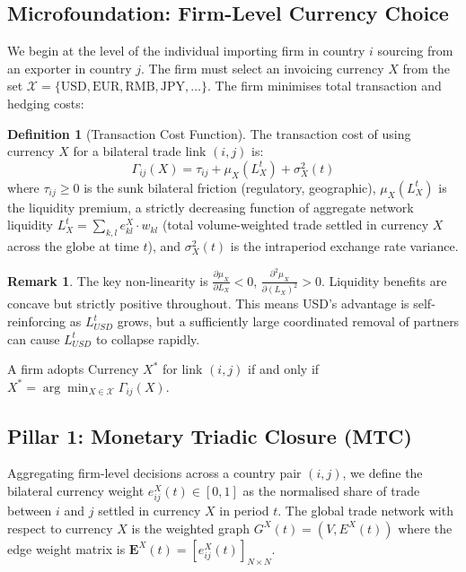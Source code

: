 \documentclass[12pt, letterpaper]{article}
\theoremstyle{definition}
\newtheorem{definition}{Definition}
\newtheorem{remark}{Remark}
\begin{document}
\subsection{Microfoundation: Firm-Level Currency Choice}

We begin at the level of the individual importing firm in country $i$ sourcing from an exporter in country $j$. The firm must select an invoicing currency $X$ from the set $\mathcal{X} = \{\text{USD}, \text{EUR}, \text{RMB}, \text{JPY}, \ldots \}$. The firm minimises total transaction and hedging costs:

\begin{definition}[Transaction Cost Function]
The transaction cost of using currency $X$ for a bilateral trade link $(i,j)$ is:
\begin{equation}
\Gamma_{ij}(X) = \tau_{ij} + \mu_X(L_X^t) + \sigma_X^2(t)
\label{eq:micro}
\end{equation}
where $\tau_{ij} \geq 0$ is the sunk bilateral friction (regulatory, geographic), $\mu_X(L_X^t)$ is the liquidity premium, a strictly decreasing function of aggregate network liquidity $L_X^t = \sum_{k,l} e_{kl}^X \cdot w_{kl}$ (total volume-weighted trade settled in currency $X$ across the globe at time $t$), and $\sigma_X^2(t)$ is the intraperiod exchange rate variance.
\end{definition}

\begin{remark}
The key non-linearity is $\frac{\partial \mu_X}{\partial L_X} < 0$, $\frac{\partial^2 \mu_X}{\partial (L_X)^2} > 0$. Liquidity benefits are concave but strictly positive throughout. This means USD's advantage is self-reinforcing as $L_{USD}^t$ grows, but a sufficiently large coordinated removal of partners can cause $L_{USD}^t$ to collapse rapidly.
\end{remark}

\noindent A firm adopts Currency $X^*$ for link $(i,j)$ if and only if $X^* = \arg\min_{X \in \mathcal{X}} \Gamma_{ij}(X)$.

\subsection{Pillar 1: Monetary Triadic Closure (MTC)}

Aggregating firm-level decisions across a country pair $(i,j)$, we define the bilateral currency weight $e_{ij}^X(t) \in [0,1]$ as the normalised share of trade between $i$ and $j$ settled in currency $X$ in period $t$. The global trade network with respect to currency $X$ is the weighted graph $G^X(t) = (V, E^X(t))$ where the edge weight matrix is $\mathbf{E}^X(t) = [e_{ij}^X(t)]_{N\times N}$.
\end{document}
